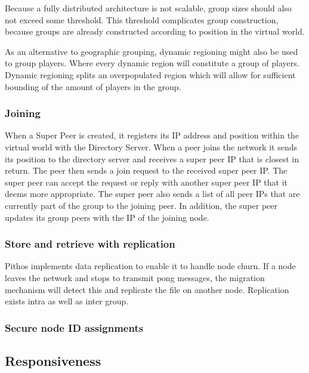 \documentclass[10pt,a4paper,conference]{IEEEtran}
\begin{document}
Because a fully distributed architecture is not scalable, group sizes should also not exceed some threshold. This threshold complicates group
construction, because groups are already constructed according to position in the virtual world.

As an alternative to geographic grouping, dynamic regioning might also be used to group players. Where every dynamic region will constitute a group
of players. Dynamic regioning splits an overpopulated region which will allow for sufficient bounding of the amount of players in the group.


\subsubsection{Joining}

When a Super Peer is created, it registers its IP address and position within the virtual world with the Directory Server. When a peer joins the
network it sends its position to the directory server and receives a super peer IP that is closest in return. The peer then sends a join request to
the received super peer IP. The super peer can accept the request or reply with another super peer IP that it deems more appropriate. The super peer
also sends a list of all peer IPs that are currently part of the group to the joining peer. In addition, the super peer updates its group peers with
the IP of the joining node.

\subsubsection{Store and retrieve with replication}

Pithos implements data replication to enable it to handle node churn. If a node leaves the network and stops to transmit pong messages, the migration
mechanism will detect this and replicate the file on another node. Replication exists intra as well as inter group.

\subsubsection{Secure node ID assignments}

\subsection{Responsiveness}
\end{document}
